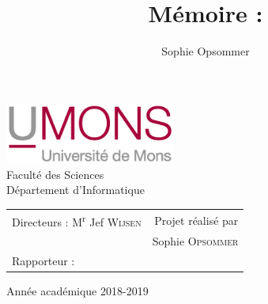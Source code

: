 \documentclass[12pt, a4paper, oneside, titlepage]{book}%
\author{Sophie Opsommer}
\title{Mémoire : }
\begin{document}
\thispagestyle{empty}
\begin{center}
\includegraphics[height=2cm]{UMONS-Logo.jpg}\\
\textnormal{\Large{Faculté des Sciences}}\\
\textnormal{\Large{Département d'Informatique}}
\end{center}

\vspace*{2cm}
\begin{center}
\end{center}

\vspace*{2cm}
\large{
\begin{center}
\begin{tabular*}{14cm}{@{\extracolsep{\fill}}lr}
Directeurs : M\textsuperscript{r} Jef \textsc{Wijsen} & Projet réalisé par\\
 & Sophie \textsc{Opsommer}\\[1em]
Rapporteur :  & \\
\end{tabular*}
\end{center}}

\vspace*{4cm}
\begin{center}
Année académique 2018-2019
\end{center}
\pagebreak

\newpage
\frontmatter %

\thispagestyle{empty}
\umonsCoverPage
\pagebreak

\newpage
\thispagestyle{empty}
\end{document}
